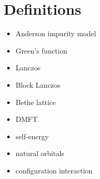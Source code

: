 
\chapter{Definitions}

\begin{itemize}
    \item Anderson impurity model
    \item Green's function
    \item Lanczos
    \item Block Lanczos
    \item Bethe lattice
    \item DMFT
    \item self-energy
    \item natural orbitals
    \item configuration interaction
\end{itemize}
